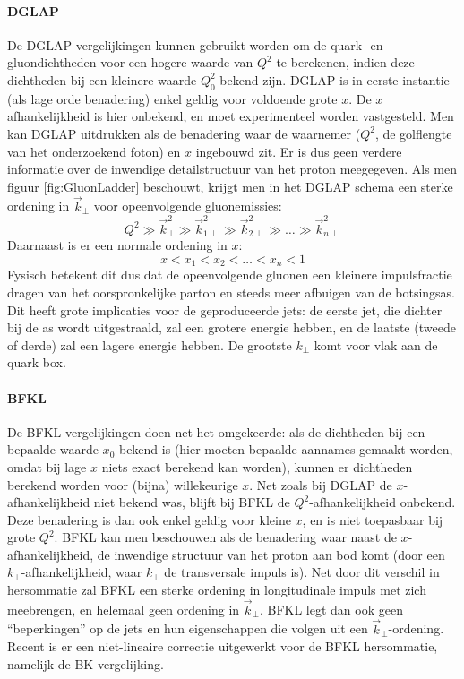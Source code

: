 \documentclass[a4paper,11pt]{article}
\numberwithin{equation}{section} %
\begin{document}
      \paragraph{DGLAP} \label{sec:DGLAP}
De DGLAP vergelijkingen kunnen gebruikt worden om de quark- en gluondichtheden voor een hogere waarde van $Q^2$ te berekenen, indien deze dichtheden bij een kleinere waarde $Q_0^2$ bekend zijn.
DGLAP is in eerste instantie (als lage orde benadering) enkel geldig voor voldoende grote $x$.
De $x$ afhankelijkheid is hier onbekend, en moet experimenteel worden vastgesteld.
Men kan DGLAP uitdrukken als de benadering waar de waarnemer ($Q^2$, de golflengte van het onderzoekend foton) en $x$ ingebouwd zit.
Er is dus geen verdere informatie over de inwendige detailstructuur van het proton meegegeven.
Als men figuur \ref{fig:GluonLadder} beschouwt, krijgt men in het DGLAP schema een sterke ordening in $\vec{k}_\perp$ voor opeenvolgende gluonemissies:
\begin{equation}
Q^2 \gg \vec{k}_\perp^2 \gg \vec{k}_{1\perp}^2 \gg \vec{k}_{2\perp}^2 \gg \hdots \gg \vec{k}_{n\perp}^2
\end{equation}
Daarnaast is er een normale ordening in $x$:
\begin{equation}
x < x_1 < x_2 < \hdots < x_n < 1
\end{equation}
Fysisch betekent dit dus dat de opeenvolgende gluonen een kleinere impulsfractie dragen van het oorspronkelijke parton en steeds meer afbuigen van de botsingsas.
Dit heeft grote implicaties voor de geproduceerde jets: de eerste jet, die dichter bij de as wordt uitgestraald, zal een grotere energie hebben, en de laatste (tweede of derde) zal een lagere energie hebben.
De grootste $k_\perp$ komt voor vlak aan de quark box.

      \paragraph{BFKL}
De BFKL vergelijkingen doen net het omgekeerde: als de dichtheden bij een bepaalde waarde $x_0$ bekend is (hier moeten bepaalde aannames gemaakt worden, omdat bij lage $x$ niets exact berekend kan worden), kunnen er dichtheden berekend worden voor (bijna) willekeurige $x$.
Net zoals bij DGLAP de $x$-afhankelijkheid niet bekend was, blijft bij BFKL de $Q^2$-afhankelijkheid onbekend.
Deze benadering is dan ook enkel geldig voor kleine $x$, en is niet toepasbaar bij grote $Q^2$.
BFKL kan men beschouwen als de benadering waar naast de $x$-afhankelijkheid, de inwendige structuur van het proton aan bod komt (door een $k_\perp$-afhankelijkheid, waar $k_\perp$ de transversale impuls is).
Net door dit verschil in hersommatie zal BFKL een sterke ordening in longitudinale impuls met zich meebrengen, en helemaal geen ordening in $\vec{k}_\perp$.
BFKL legt dan ook geen “beperkingen” op de jets en hun eigenschappen die volgen uit een $\vec{k}_\perp$-ordening.
Recent is er een niet-lineaire correctie uitgewerkt voor de BFKL hersommatie, namelijk de BK vergelijking.
\end{document}
